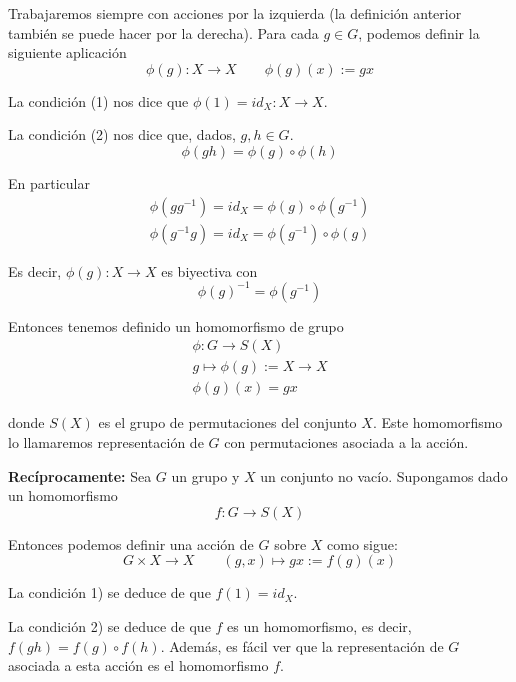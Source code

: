 \documentclass{article}
\begin{document}
Trabajaremos siempre con acciones por la izquierda (la definición anterior también se puede hacer por la derecha). Para cada $g\in G$, podemos definir la siguiente aplicación
\begin{equation*}
\phi(g):X\longrightarrow X\qquad \phi(g)(x):=gx
\end{equation*}

La condición (1) nos dice que $\phi(1)=id_X:X\longrightarrow X$.

La condición (2) nos dice que, dados, $g,h\in G$.
\begin{equation*}
\phi(gh)=\phi(g)\circ \phi(h)
\end{equation*}

En particular
\begin{gather*}
\phi(gg^{-1})=id_X=\phi(g)\circ \phi(g^{-1}) \\
\phi(g^{-1}g)=id_X=\phi(g^{-1})\circ \phi(g)
\end{gather*}

Es decir, $\phi(g):X\longrightarrow X$ es biyectiva con
\begin{equation*}
\phi(g)^{-1}=\phi(g^{-1})
\end{equation*}

Entonces tenemos definido un homomorfismo de grupo
\begin{gather*}
\phi:G\longrightarrow S(X) \\
g\longmapsto \phi(g):=X\longrightarrow X \\
\phi(g)(x)=gx
\end{gather*}

donde $S(X)$ es el grupo de permutaciones del conjunto $X$. Este homomorfismo lo llamaremos representación de $G$ con permutaciones asociada a la acción.

\textbf{Recíprocamente:} Sea $G$ un grupo y $X$ un conjunto no vacío. Supongamos dado un homomorfismo
\begin{equation*}
f:G\longrightarrow S(X)
\end{equation*}

Entonces podemos definir una acción de $G$ sobre $X$ como sigue:
\begin{equation*}
G\times X\longrightarrow X \qquad (g,x)\longmapsto gx:=f(g)(x)
\end{equation*}

La condición 1) se deduce de que $f(1)=id_X$.

La condición 2) se deduce de que $f$ es un homomorfismo, es decir, $f(gh)=f(g)\circ f(h)$. Además, es fácil ver que la representación de $G$ asociada a esta acción es el homomorfismo $f$. \\
\end{document}
